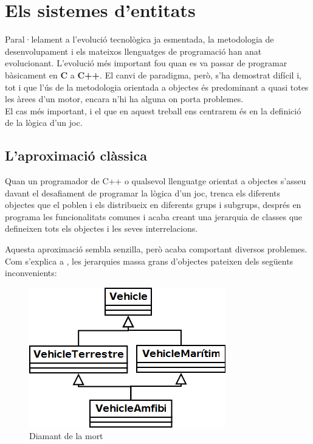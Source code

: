 \section{Els sistemes d'entitats}

Paral·lelament a l'evolució tecnològica ja esmentada, la metodologia de desenvolupament i els mateixos llenguatges de programació han anat evolucionant. L'evolució més important fou quan es va passar de programar bàsicament en {\bf C} a {\bf C++}. El canvi de paradigma, però, s'ha demostrat difícil i, tot i que l'ús de la metodologia orientada a objectes és predominant a quasi totes les àrees d'un motor, encara n'hi ha alguna on porta problemes.
\\

El cas més important, i el que en aquest treball ens centrarem és en la definició de la lògica d'un joc.

\subsection{L'aproximació clàssica}

Quan un programador de {C++} o qualsevol llenguatge orientat a objectes s'asseu davant el desafiament de programar la lògica d'un joc, trenca els diferents objectes que el poblen i els distribueix en diferents grups i subgrups, després en programa les funcionalitats comunes i acaba creant una jerarquia de classes que defineixen tots els objectes i les seves interrelacions. 

Aquesta aproximació sembla senzilla, però acaba comportant diversos problemes. Com s'explica a \citep[p.~719]{Gregory09}, les jerarquies massa grans d'objectes pateixen dels següents inconvenients:


\begin{figure}
  \centering
  \includegraphics[width=0.58\linewidth]{./img/RombeMort.png}
  \caption{Diamant de la mort \label{fig:RombeMort}}
\end{figure}

